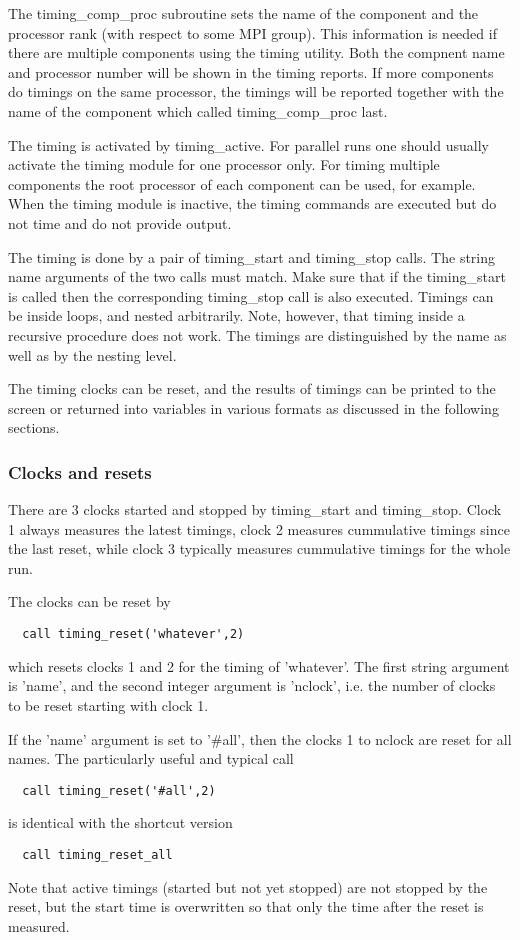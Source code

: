 The timing\_comp\_proc subroutine sets the name of the component and
the processor rank (with respect to some MPI group). This
information is needed if there are multiple components using the
timing utility. Both the compnent name and processor number will be
shown in the timing reports. If more components do timings on the same 
processor, the timings will be reported together with the name
of the component which called timing\_comp\_proc last.

The timing is activated by timing\_active. For parallel runs
one should usually activate the timing module for one processor only.
For timing multiple components the root processor of each component
can be used, for example.
When the timing module is inactive, the timing commands are executed 
but do not time and do not provide output.

The timing is done by a pair of timing\_start and timing\_stop calls.
The string name arguments of the two calls must match. 
Make sure that if the timing\_start is called then the corresponding
timing\_stop call is also executed. 
Timings can be inside loops, and nested arbitrarily. 
Note, however, that timing inside a recursive procedure does not work.
The timings are distinguished by the name as well as by the nesting level.

The timing clocks can be reset, and the results of timings can be printed 
to the screen or returned into variables in various formats as discussed 
in the following sections. 

\subsubsection{Clocks and resets}

There are 3 clocks started and stopped by timing\_start
and timing\_stop. Clock 1 always measures the latest timings,
clock 2 measures cummulative timings since the last reset,
while clock 3 typically measures cummulative timings for the whole run.

The clocks can be reset by
\begin{verbatim}
  call timing_reset('whatever',2)
\end{verbatim}
which resets clocks 1 and 2 for the timing of 'whatever'. 
The first string argument is 'name', and the second integer
argument is 'nclock', i.e. the number of clocks to be reset
starting with clock 1.

If the 'name' argument is set to '\#all', 
then the clocks 1 to nclock are reset for all names.
The particularly useful and typical call 
\begin{verbatim}
  call timing_reset('#all',2)
\end{verbatim}
is identical with the shortcut version
\begin{verbatim}
  call timing_reset_all
\end{verbatim}
Note that active timings (started but not yet stopped) are not stopped 
by the reset, but the start time is overwritten
so that only the time after the reset is measured.

